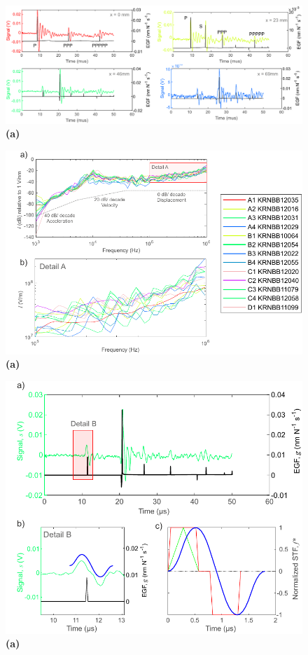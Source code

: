 \documentclass[preprint,3p, 11pt,authoryear]{elsarticle}
\begin{document}
\begin{figure}[ht]
     	\centering
\includegraphics[scale= 0.90]{FIG4.pdf} 
\caption{\textbf{(a)}  }
	\label{fig4} 
\end{figure}

\begin{figure}[ht]
     	\centering
\includegraphics[scale= 0.9]{FIG5.pdf} 
\caption{\textbf{(a)}  }
	\label{fig5} 
\end{figure}


\begin{figure}[ht]
     	\centering
\includegraphics[scale= 0.9]{FIG6.pdf} 
\caption{\textbf{(a)}  }
	\label{fig6} 
\end{figure}
\end{document}
